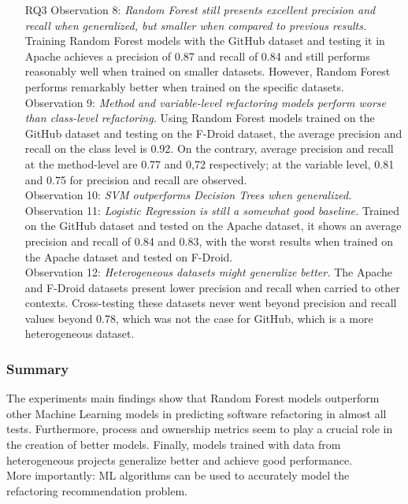 \begin{itemize}
    \item[RQ3] Observation 8: \textit{Random Forest still presents excellent precision and recall when generalized, but smaller when compared to previous results.} Training Random Forest models with the GitHub dataset and testing it in Apache achieves a precision of 0.87 and recall of 0.84 and still performs reasonably well when trained on smaller datasets. However, Random Forest performs remarkably better when trained on the specific datasets.\\Observation 9: \textit{Method and variable-level refactoring models perform worse than class-level refactoring.} Using Random Forest models trained on the GitHub dataset and testing on the F-Droid dataset, the average precision and recall on the class level is 0.92. On the contrary, average precision and recall at the method-level are 0.77 and 0,72 respectively; at the variable level, 0.81 and 0.75 for precision and recall are observed.\\ Observation 10: \textit{SVM outperforms Decision Trees when generalized.} \\ Observation 11: \textit{Logistic Regression is still a somewhat good baseline.} Trained on the GitHub dataset and tested on the Apache dataset, it shows an average precision and recall of 0.84 and 0.83, with the worst results when trained on the Apache dataset and tested on F-Droid. \\ Observation 12: \textit{Heterogeneous datasets might generalize better.} The Apache and F-Droid datasets present lower precision and recall when carried to other contexts. Cross-testing these datasets never went beyond precision and recall values beyond 0.78, which was not the case for GitHub, which is a more heterogeneous dataset.
\end{itemize}
\subsubsection{Summary}
The experiments main findings show that Random Forest models outperform other Machine Learning models in predicting software refactoring in almost all tests. Furthermore, process and ownership metrics seem to play a crucial role in the creation of better models. Finally, models trained with data from heterogeneous projects generalize better and achieve good performance.\\
More importantly: ML algorithms can be used to accurately model the refactoring recommendation problem.
